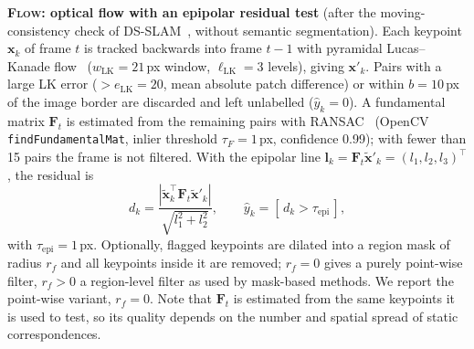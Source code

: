 \documentclass[conference]{IEEEtran}
\newcommand{\flow}{\textsc{Flow}}
\begin{document}
\textbf{\flow{}: optical flow with an epipolar residual test} (after the moving-consistency check of DS-SLAM~\cite{yu2018dsslam}, without semantic segmentation). Each keypoint $\mathbf{x}_k$ of frame $t$ is tracked backwards into frame $t{-}1$ with pyramidal Lucas--Kanade flow~\cite{lucas1981iterative} ($w_{\mathrm{LK}}=21$\,px window, $\ell_{\mathrm{LK}}=3$ levels), giving $\mathbf{x}'_k$. Pairs with a large LK error ($>e_{\mathrm{LK}}=20$, mean absolute patch difference) or within $b=10$\,px of the image border are discarded and left unlabelled ($\hat{y}_k=0$). A fundamental matrix $\mathbf{F}_t$ is estimated from the remaining pairs with RANSAC~\cite{hartley2004mvg} (OpenCV \texttt{findFundamentalMat}, inlier threshold $\tau_F=1$\,px, confidence 0.99); with fewer than 15 pairs the frame is not filtered. With the epipolar line $\mathbf{l}_k=\mathbf{F}_t\tilde{\mathbf{x}}'_k=(l_1,l_2,l_3)^\top$, the residual is
\begin{equation}
d_k=\frac{|\tilde{\mathbf{x}}_k^\top \mathbf{F}_t\tilde{\mathbf{x}}'_k|}{\sqrt{l_1^2+l_2^2}},\qquad \hat{y}_k=[\,d_k>\tau_{\mathrm{epi}}\,],
\label{eq:epi}
\end{equation}
with $\tau_{\mathrm{epi}}=1$\,px. Optionally, flagged keypoints are dilated into a region mask of radius $r_f$ and all keypoints inside it are removed; $r_f=0$ gives a purely point-wise filter, $r_f>0$ a region-level filter as used by mask-based methods. We report the point-wise variant, $r_f=0$. Note that $\mathbf{F}_t$ is estimated from the same keypoints it is used to test, so its quality depends on the number and spatial spread of static correspondences.
\end{document}
